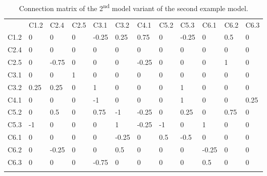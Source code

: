 \documentclass[graybox]{svmult}
\begin{document}
\begin{table}
\caption{Connection matrix of the 2\textsuperscript{nd} model variant of the second example model.}
\label{tab:BP2Spartial-V2connectionMtx}
\begin{center}
\begin{tabular}{l|lllllllllll}
\hline\noalign{\smallskip}
 & C1.2 & C2.4 & C2.5 & C3.1 & C3.2 & C4.1 & C5.2 & C5.3 & C6.1 & C6.2 & C6.3\\
\noalign{\smallskip}\hline\noalign{\smallskip}
C1.2 & 0 & 0 & 0 & -0.25 & 0.25 & 0.75 & 0 & -0.25 & 0 & 0.5 & 0\\
C2.4 & 0 & 0 & 0 & 0 & 0 & 0 & 0 & 0 & 0 & 0 & 0\\
C2.5 & 0 & -0.75 & 0 & 0 & 0 & -0.25 & 0 & 0 & 0 & 1 & 0\\
C3.1 & 0 & 0 & 1 & 0 & 0 & 0 & 0 & 0 & 0 & 0 & 0\\
C3.2 & 0.25 & 0.25 & 0 & 1 & 0 & 0 & 0 & 1 & 0 & 0 & 0\\
C4.1 & 0 & 0 & 0 & -1 & 0 & 0 & 0 & 1 & 0 & 0 & 0.25\\
C5.2 & 0 & 0.5 & 0 & 0.75 & -1 & -0.25 & 0 & 0.25 & 0 & 0.75 & 0\\
C5.3 & -1 & 0 & 0 & 0 & 1 & -0.25 & -1 & 0 & 1 & 0 & 0\\
C6.1 & 0 & 0 & 0 & 0 & -0.25 & 0 & 0.5 & -0.5 & 0 & 0 & 0\\
C6.2 & 0 & -0.25 & 0 & 0 & 0.5 & 0 & 0 & 0 & -0.25 & 0 & 0\\
C6.3 & 0 & 0 & 0 & -0.75 & 0 & 0 & 0 & 0 & 0.5 & 0 & 0\\
\noalign{\smallskip}\hline
\end{tabular}
\end{center}
\end{table}
\end{document}
